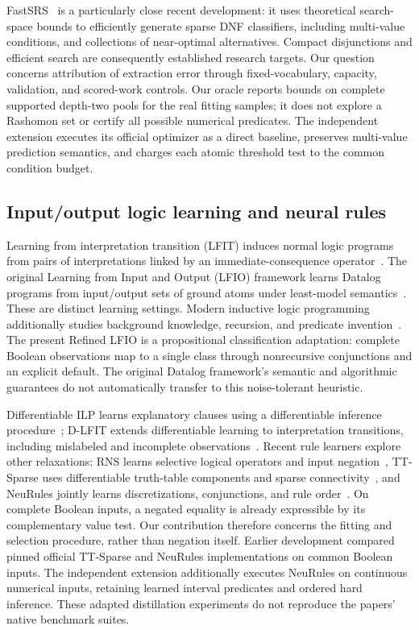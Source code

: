 \documentclass[review,12pt]{elsarticle}
\begin{document}
FastSRS~\citep{molero2026} is a particularly close recent development: it uses theoretical search-space bounds to efficiently generate sparse DNF classifiers, including multi-value conditions, and collections of near-optimal alternatives. Compact disjunctions and efficient search are consequently established research targets. Our question concerns attribution of extraction error through fixed-vocabulary, capacity, validation, and scored-work controls. Our oracle reports bounds on complete supported depth-two pools for the real fitting samples; it does not explore a Rashomon set or certify all possible numerical predicates. The independent extension executes its official optimizer as a direct baseline, preserves multi-value prediction semantics, and charges each atomic threshold test to the common condition budget.

\subsection{Input/output logic learning and neural rules}
Learning from interpretation transition (LFIT) induces normal logic programs from pairs of interpretations linked by an immediate-consequence operator~\citep{inoue2014}. The original Learning from Input and Output (LFIO) framework learns Datalog programs from input/output sets of ground atoms under least-model semantics~\citep{wang2017lfio}. These are distinct learning settings. Modern inductive logic programming additionally studies background knowledge, recursion, and predicate invention~\citep{cropper2022}. The present Refined LFIO is a propositional classification adaptation: complete Boolean observations map to a single class through nonrecursive conjunctions and an explicit default. The original Datalog framework's semantic and algorithmic guarantees do not automatically transfer to this noise-tolerant heuristic.

Differentiable ILP learns explanatory clauses using a differentiable inference procedure~\citep{evans2018}; D-LFIT extends differentiable learning to interpretation transitions, including mislabeled and incomplete observations~\citep{gao2022}. Recent rule learners explore other relaxations: RNS learns selective logical operators and input negation~\citep{wei2026}, TT-Sparse uses differentiable truth-table components and sparse connectivity~\citep{soegeng2026}, and NeuRules jointly learns discretizations, conjunctions, and rule order~\citep{xu2025}. On complete Boolean inputs, a negated equality is already expressible by its complementary value test. Our contribution therefore concerns the fitting and selection procedure, rather than negation itself. Earlier development compared pinned official TT-Sparse and NeuRules implementations on common Boolean inputs. The independent extension additionally executes NeuRules on continuous numerical inputs, retaining learned interval predicates and ordered hard inference. These adapted distillation experiments do not reproduce the papers' native benchmark suites.
\end{document}
